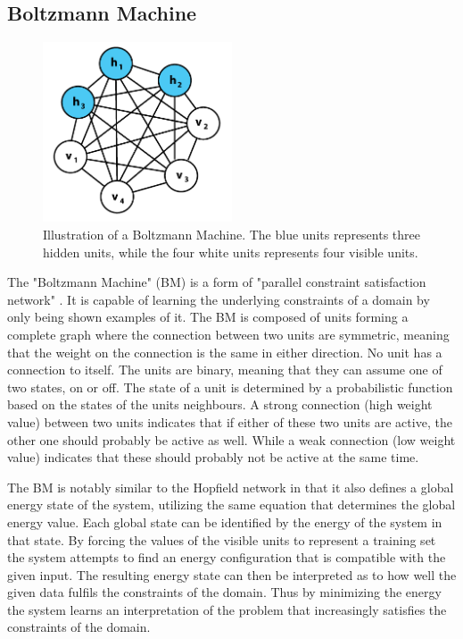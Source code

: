 \subsection{Boltzmann Machine}


\begin{figure}[htbp]
	\begin{center}
		\includegraphics[width=0.5\textwidth]{inc/boltzmann_machine.png}
		\caption{Illustration of a Boltzmann Machine. The blue units represents three hidden units, while the four white units represents four visible units.\protect\footnotemark}
		\label{fig:boltzmann_machine}
	\end{center}
\end{figure}

The "Boltzmann Machine" (BM) is a form of "parallel constraint satisfaction network" \cite{ackley1985learning}. It is capable of learning the underlying constraints of a domain by only being shown examples of it. The BM is composed of units forming a complete graph where the connection between two units are symmetric, meaning that the weight on the connection is the same in either direction. No unit has a connection to itself. The units are binary, meaning that they can assume one of two states, on or off. The state of a unit is determined by a probabilistic function based on the states of the units neighbours. A strong connection (high weight value) between two units indicates that if either of these two units are active, the other one should probably be active as well. While a weak connection (low weight value) indicates that these should probably not be active at the same time.

The BM is notably similar to the Hopfield network in that it also defines a global energy state of the system, utilizing the same equation that determines the global energy value. Each global state can be identified by the energy of the system in that state. By forcing the values of the visible units to represent a training set the system attempts to find an energy configuration that is compatible with the given input. The resulting energy state can then be interpreted as to how well the given data fulfils the constraints of the domain. Thus by minimizing the energy the system learns an interpretation of the problem that increasingly satisfies the constraints of the domain.


